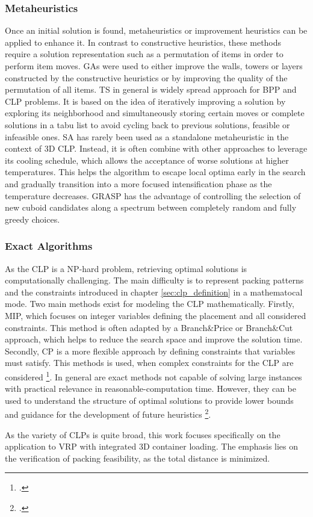 \subsubsection{Metaheuristics}
Once an initial solution is found, metaheuristics or improvement heuristics can be applied
to enhance it. In contrast to constructive heuristics, these methods require a solution
representation such as a permutation of items in order to perform item moves. \gls{GA}s were
used to either improve the walls, towers or layers constructed by the constructive heuristics
or by improving the quality of the permutation of all items.
\gls{TS} in general is widely spread approach for \gls{BPP} and \gls{CLP} problems. It is based on
the idea of iteratively improving a solution by exploring its neighborhood and simultaneously
storing certain moves or complete solutions in a tabu list to avoid cycling back to
previous solutions, feasible or infeasible ones. \gls{SA} has rarely been used as a
standalone metaheuristic in the context of \gls{3D} \gls{CLP}. Instead, it is often combine
with other approaches to leverage its cooling schedule, which allows the acceptance of
worse solutions at higher temperatures. This helps the algorithm to escape local optima
early in the search and gradually transition into a more focused intensification phase as
the temperature decreases. \gls{GRASP} has the advantage of controlling the selection of new
cuboid candidates along a spectrum between completely random and fully greedy choices.

\subsubsection{Exact Algorithms}
As the \gls{CLP} is a NP-hard problem, retrieving optimal solutions is computationally
challenging. The main difficulty is to represent packing patterns and the constraints
introduced in chapter \ref{sec:clp_definition} in a mathematocal mode. Two main methods
exist for modeling the \gls{CLP} mathematically. Firstly, \gls{MIP}, which focuses on
integer variables defining the placement and all considered constraints. This method is
often adapted by a Branch\&Price or Branch\&Cut approach, which helps to reduce the
search space and improve the solution time. Secondly, \gls{CP} is a more flexible
approach by defining constraints that variables must satisfy. This methods is used, when
complex constraints for the \gls{CLP} are considered \footcite[cf.][p.7-11]{tamke_branch-and-cut_2024}.
In general are exact methods not capable of solving large instances with practical relevance
in reasonable-computation time. However, they can be used to understand the structure
of optimal solutions to provide lower bounds and guidance for the development of future
heuristics \footcite[cf.][p.2]{tamke_branch-and-cut_2024}.




As the variety of \gls{CLP}s is quite broad, this work focuses specifically on
the application to \gls{VRP} with integrated \gls{3D} container loading. The emphasis lies
on the verification of packing feasibility, as the total distance is minimized.